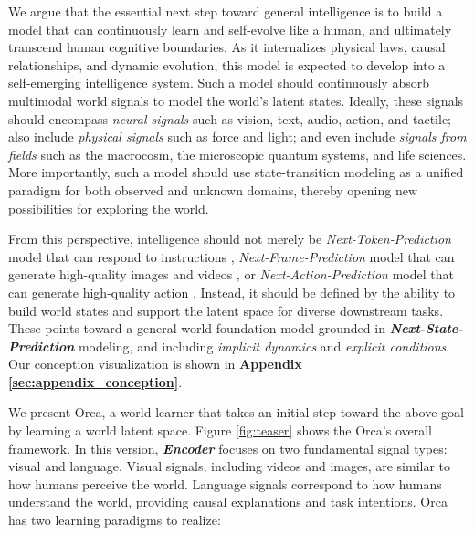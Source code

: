 \documentclass{llmxive}
\begin{document}
We argue that the essential next step toward general intelligence is to build a model that can continuously learn and self-evolve like a human, and ultimately transcend human cognitive boundaries. As it internalizes physical laws, causal relationships, and dynamic evolution, this model is expected to develop into a self-emerging intelligence system. Such a model should continuously absorb multimodal world signals to model the world's latent states. Ideally, these signals should encompass \textit{neural signals} such as vision, text, audio, action, and tactile; also include \textit{physical signals} such as force and light; and even include \textit{signals from fields} such as the macrocosm, the microscopic quantum systems, and life sciences.
More importantly, such a model should use state-transition modeling as a unified paradigm for both observed and unknown domains, thereby opening new possibilities for exploring the world.



From this perspective, intelligence should not merely be \textit{Next-Token-Prediction} model that can respond to instructions \citep{DeepSeek-V4, qwen36_35b_a3b, Emu3, GPT54}, \textit{Next-Frame-Prediction} model that can generate high-quality images and videos \citep{nanobananapro, ChatGPT-Images-2.0, seedance2.0}, or \textit{Next-Action-Prediction} model that can generate high-quality action \citep{pi0.7, DreamZero, GR00TN1.7}. Instead, it should be defined by the ability to build world states and support the latent space for diverse downstream tasks. These points toward a general world foundation model grounded in \textit{\textbf{Next-State-Prediction}} modeling, and including \textit{implicit dynamics} and \textit{explicit conditions}.
Our conception visualization is shown in \textbf{Appendix \ref{sec:appendix_conception}}.

We present Orca, a world learner that takes an initial step toward the above goal by learning a world latent space. Figure \ref{fig:teaser} shows the Orca's overall framework. In this version, \textbf{\textit{Encoder}} focuses on two fundamental signal types: visual and language. Visual signals, including videos and images, are similar to how humans perceive the world. Language signals correspond to how humans understand the world, providing causal explanations and task intentions. Orca has two learning paradigms to realize:
\end{document}
